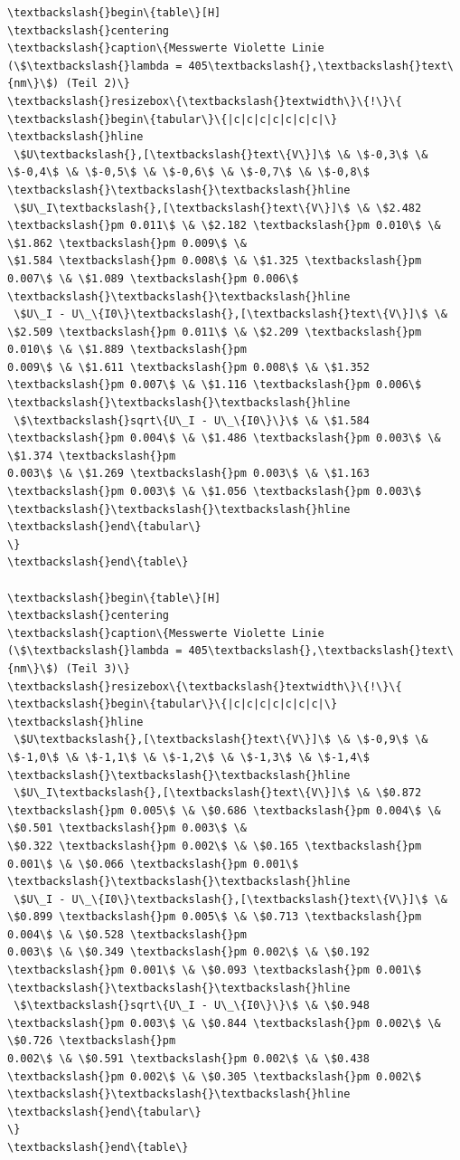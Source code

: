 \begin{Verbatim}[commandchars=\\\{\}]
\textbackslash{}begin\{table\}[H]
\textbackslash{}centering
\textbackslash{}caption\{Messwerte Violette Linie (\$\textbackslash{}lambda = 405\textbackslash{},\textbackslash{}text\{nm\}\$) (Teil 2)\}
\textbackslash{}resizebox\{\textbackslash{}textwidth\}\{!\}\{
\textbackslash{}begin\{tabular\}\{|c|c|c|c|c|c|c|\}
\textbackslash{}hline
 \$U\textbackslash{},[\textbackslash{}text\{V\}]\$ \& \$-0,3\$ \& \$-0,4\$ \& \$-0,5\$ \& \$-0,6\$ \& \$-0,7\$ \& \$-0,8\$ \textbackslash{}\textbackslash{}\textbackslash{}hline
 \$U\_I\textbackslash{},[\textbackslash{}text\{V\}]\$ \& \$2.482 \textbackslash{}pm 0.011\$ \& \$2.182 \textbackslash{}pm 0.010\$ \& \$1.862 \textbackslash{}pm 0.009\$ \&
\$1.584 \textbackslash{}pm 0.008\$ \& \$1.325 \textbackslash{}pm 0.007\$ \& \$1.089 \textbackslash{}pm 0.006\$ \textbackslash{}\textbackslash{}\textbackslash{}hline
 \$U\_I - U\_\{I0\}\textbackslash{},[\textbackslash{}text\{V\}]\$ \& \$2.509 \textbackslash{}pm 0.011\$ \& \$2.209 \textbackslash{}pm 0.010\$ \& \$1.889 \textbackslash{}pm
0.009\$ \& \$1.611 \textbackslash{}pm 0.008\$ \& \$1.352 \textbackslash{}pm 0.007\$ \& \$1.116 \textbackslash{}pm 0.006\$ \textbackslash{}\textbackslash{}\textbackslash{}hline
 \$\textbackslash{}sqrt\{U\_I - U\_\{I0\}\}\$ \& \$1.584 \textbackslash{}pm 0.004\$ \& \$1.486 \textbackslash{}pm 0.003\$ \& \$1.374 \textbackslash{}pm
0.003\$ \& \$1.269 \textbackslash{}pm 0.003\$ \& \$1.163 \textbackslash{}pm 0.003\$ \& \$1.056 \textbackslash{}pm 0.003\$ \textbackslash{}\textbackslash{}\textbackslash{}hline
\textbackslash{}end\{tabular\}
\}
\textbackslash{}end\{table\}

\textbackslash{}begin\{table\}[H]
\textbackslash{}centering
\textbackslash{}caption\{Messwerte Violette Linie (\$\textbackslash{}lambda = 405\textbackslash{},\textbackslash{}text\{nm\}\$) (Teil 3)\}
\textbackslash{}resizebox\{\textbackslash{}textwidth\}\{!\}\{
\textbackslash{}begin\{tabular\}\{|c|c|c|c|c|c|c|\}
\textbackslash{}hline
 \$U\textbackslash{},[\textbackslash{}text\{V\}]\$ \& \$-0,9\$ \& \$-1,0\$ \& \$-1,1\$ \& \$-1,2\$ \& \$-1,3\$ \& \$-1,4\$ \textbackslash{}\textbackslash{}\textbackslash{}hline
 \$U\_I\textbackslash{},[\textbackslash{}text\{V\}]\$ \& \$0.872 \textbackslash{}pm 0.005\$ \& \$0.686 \textbackslash{}pm 0.004\$ \& \$0.501 \textbackslash{}pm 0.003\$ \&
\$0.322 \textbackslash{}pm 0.002\$ \& \$0.165 \textbackslash{}pm 0.001\$ \& \$0.066 \textbackslash{}pm 0.001\$ \textbackslash{}\textbackslash{}\textbackslash{}hline
 \$U\_I - U\_\{I0\}\textbackslash{},[\textbackslash{}text\{V\}]\$ \& \$0.899 \textbackslash{}pm 0.005\$ \& \$0.713 \textbackslash{}pm 0.004\$ \& \$0.528 \textbackslash{}pm
0.003\$ \& \$0.349 \textbackslash{}pm 0.002\$ \& \$0.192 \textbackslash{}pm 0.001\$ \& \$0.093 \textbackslash{}pm 0.001\$ \textbackslash{}\textbackslash{}\textbackslash{}hline
 \$\textbackslash{}sqrt\{U\_I - U\_\{I0\}\}\$ \& \$0.948 \textbackslash{}pm 0.003\$ \& \$0.844 \textbackslash{}pm 0.002\$ \& \$0.726 \textbackslash{}pm
0.002\$ \& \$0.591 \textbackslash{}pm 0.002\$ \& \$0.438 \textbackslash{}pm 0.002\$ \& \$0.305 \textbackslash{}pm 0.002\$ \textbackslash{}\textbackslash{}\textbackslash{}hline
\textbackslash{}end\{tabular\}
\}
\textbackslash{}end\{table\}


\end{Verbatim}
